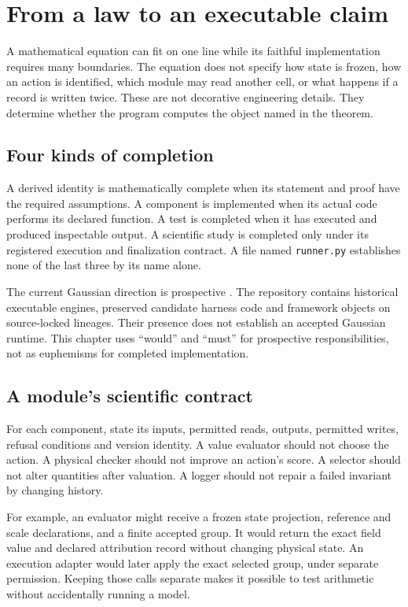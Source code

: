\chapter{From a law to an executable claim}\label{ch:software-claim}
A mathematical equation can fit on one line while its faithful implementation
requires many boundaries. The equation does not specify how state is frozen,
how an action is identified, which module may read another cell, or what
happens if a record is written twice. These are not decorative engineering
details. They determine whether the program computes the object named in
the theorem.

\section{Four kinds of completion}
A derived identity is mathematically complete when its statement and proof
have the required assumptions. A component is implemented when its actual
code performs its declared function. A test is completed when it has
executed and produced inspectable output. A scientific study is completed
only under its registered execution and finalization contract. A file named
\texttt{runner.py} establishes none of the last three by its name alone.

The current Gaussian direction is prospective \cite{programme}. The
repository contains historical executable engines, preserved candidate
harness code and framework objects on source-locked lineages. Their presence
does not establish an accepted Gaussian runtime. This chapter uses
``would'' and ``must'' for prospective responsibilities, not as euphemisms
for completed implementation.

\section{A module's scientific contract}
For each component, state its inputs, permitted reads, outputs, permitted
writes, refusal conditions and version identity. A value evaluator should
not choose the action. A physical checker should not improve an action's
score. A selector should not alter quantities after valuation. A logger
should not repair a failed invariant by changing history.

For example, an evaluator might receive a frozen state projection, reference
and scale declarations, and a finite accepted group. It would return the
exact field value and declared attribution record without changing physical
state. An execution adapter would later apply the exact selected group,
under separate permission. Keeping those calls separate makes it possible
to test arithmetic without accidentally running a model.

